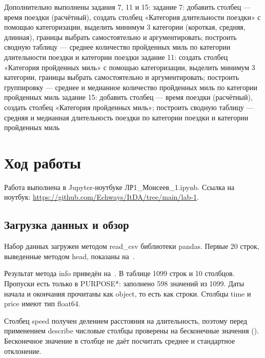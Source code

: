 \documentclass[a4paper,14pt]{extarticle}
\begin{document}
Дополнительно выполнены задания 7, 11 и 15:
\suailist
задание 7: добавить столбец — время поездки (расчётный), создать столбец «Категория длительности поездки» с помощью категоризации, выделить минимум 3 категории (короткая, средняя, длинная), границы выбрать самостоятельно и аргументировать; построить сводную таблицу — среднее количество пройденных миль по категории длительности поездки и категории поездки
задание 11: создать столбец «Категория пройденных миль» с помощью категоризации, выделить минимум 3 категории, границы выбрать самостоятельно и аргументировать; построить группировку — среднее и медианное количество пройденных миль по категории пройденных миль
задание 15: добавить столбец — время поездки (расчётный), создать столбец «Категория пройденных миль»; построить сводную таблицу — средняя и медианная длительность поездки по категории поездки и категории пройденных миль

\section{Ход работы}

Работа выполнена в Jupyter-ноутбуке ЛР1\_Моисеев\_1.ipynb. Ссылка на ноутбук: \url{https://github.com/Echways/ItDA/tree/main/lab-1}.

\subsection{Загрузка данных и обзор}

Набор данных загружен методом read\_csv библиотеки pandas. Первые 20 строк, выведенные методом head, показаны на~.


Результат метода info приведён на~. В таблице 1099 строк и 10 столбцов. Пропуски есть только в PURPOSE*: заполнено 598 значений из 1099. Даты начала и окончания прочитаны как object, то есть как строки. Столбцы time и price имеют тип float64.


Столбец speed получен делением расстояния на длительность, поэтому перед применением describe числовые столбцы проверены на бесконечные значения (). Бесконечное значение в столбце не даёт посчитать среднее и стандартное отклонение.

\end{document}

